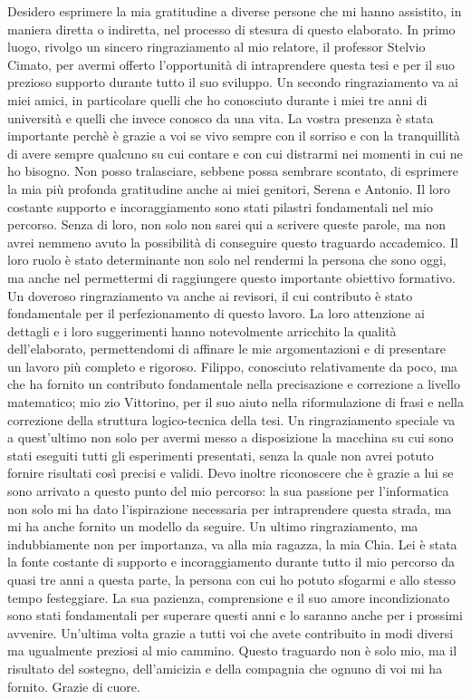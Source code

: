 Desidero esprimere la mia gratitudine a diverse persone che mi hanno assistito, in maniera
diretta o indiretta, nel processo di stesura di questo elaborato.  
In primo luogo, rivolgo un sincero ringraziamento al mio relatore, il professor 
Stelvio Cimato, per avermi offerto l'opportunità di intraprendere questa tesi e per 
il suo prezioso supporto durante tutto il suo sviluppo. Un secondo ringraziamento va ai 
miei amici, in particolare quelli che ho conosciuto durante i miei tre anni di università
e quelli che invece conosco da una vita. La vostra presenza è stata importante perchè è 
grazie a voi se vivo sempre con il sorriso e con la tranquillità di avere sempre qualcuno 
su cui contare e con cui distrarmi nei momenti in cui ne ho bisogno. 
Non posso tralasciare, sebbene possa sembrare scontato, di esprimere la mia più profonda 
gratitudine anche ai miei genitori, Serena e Antonio. Il loro costante supporto e incoraggiamento sono stati 
pilastri fondamentali nel mio percorso. Senza di loro, non solo non sarei qui a 
scrivere queste parole, ma non avrei nemmeno avuto la possibilità di conseguire 
questo traguardo accademico. Il loro ruolo è stato determinante non solo nel rendermi 
la persona che sono oggi, ma anche nel permettermi di raggiungere questo importante 
obiettivo formativo.
Un doveroso ringraziamento va anche ai revisori, il cui contributo è stato fondamentale
per il perfezionamento di questo lavoro. La loro attenzione ai dettagli e
i loro suggerimenti hanno notevolmente arricchito la qualità
dell'elaborato, permettendomi di affinare le mie argomentazioni e di presentare un
lavoro più completo e rigoroso. Filippo, conosciuto relativamente da poco, ma che ha 
fornito un contributo fondamentale nella precisazione e correzione a livello matematico; 
mio zio Vittorino, per il suo aiuto nella riformulazione di frasi e nella
correzione della struttura logico-tecnica della tesi.
Un ringraziamento speciale va a quest'ultimo non solo per avermi messo a 
disposizione la macchina su cui sono stati eseguiti tutti gli esperimenti presentati, 
senza la quale non avrei potuto fornire risultati così precisi e validi.
Devo inoltre riconoscere che è grazie a lui se sono arrivato a questo punto del mio
percorso: la sua passione per l'informatica non solo mi ha dato l'ispirazione necessaria
per intraprendere questa strada, ma mi ha anche fornito un modello da seguire.
Un ultimo ringraziamento, ma indubbiamente non per importanza, va alla mia ragazza, la 
mia Chia. Lei è stata la fonte costante di supporto e incoraggiamento durante tutto il 
mio percorso da quasi tre anni a questa parte, la persona con cui ho potuto sfogarmi e allo stesso tempo 
festeggiare. La sua pazienza, comprensione e il suo amore incondizionato sono stati 
fondamentali per superare questi anni e lo saranno anche per i prossimi avvenire.  
Un'ultima volta grazie a tutti voi che avete contribuito in modi diversi ma ugualmente 
preziosi al mio cammino. Questo traguardo non è solo mio, ma il risultato del sostegno, 
dell'amicizia e della compagnia che ognuno di voi mi ha fornito. Grazie di cuore.